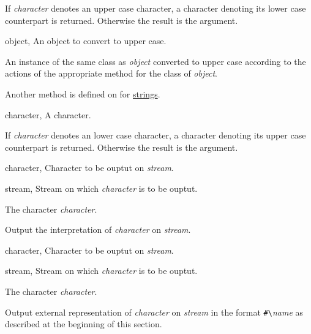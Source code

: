 \begin{optDefinition}
\result%
If {\em character\/} denotes an upper case character, a character denoting its
lower case counterpart is returned.  Otherwise the result is the argument.


\begin{genericargs}
    \item[object, \classref{object}] An object to convert to upper case.
\end{genericargs}

\result%
An instance of the same class as {\em object\/} converted to upper case
according to the actions of the appropriate method for the class of {\em
    object}.

\seealso%
Another method is defined on  for
\hyperref[string]{strings}.  

\begin{specargs}
    \item[character, \classref{character}] A character.
\end{specargs}

\result%
If {\em character\/} denotes an lower case character, a character denoting its
upper case counterpart is returned.  Otherwise the result is the argument.


\begin{specargs}
    \item[character, \classref{character}] Character to be ouptut on {\em stream}.

    \item[stream, \classref{stream}] Stream on which {\em character\/} is to be
    ouptut.
\end{specargs}

\result%
The character {\em character}.

\remarks%
Output the interpretation of {\em character\/} on {\em stream}.


\begin{specargs}
    \item[character, \classref{character}] Character to be ouptut on {\em stream}.

    \item[stream, \classref{stream}] Stream on which {\em character\/} is to be
    ouptut.
\end{specargs}

\result%
The character {\em character}.

\remarks%
Output external representation of {\em character\/} on {\em stream\/} in the
format \verb+#\+{\em{}name\/} as described at the beginning of this section.

\end{optDefinition}
